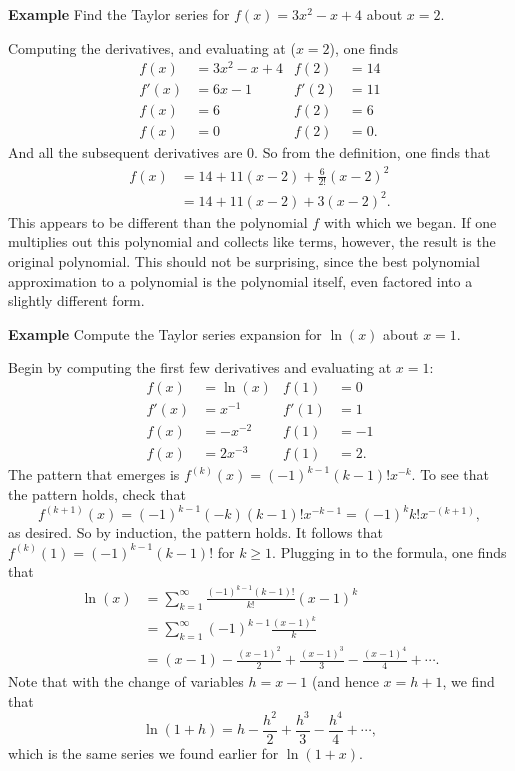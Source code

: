 \documentclass[twoside,openright,titlepage,a4paper]{book}
\begin{document}
\begin{sloppypar}
\textbf{Example} Find the Taylor series for $f(x) = 3x^2-x+4$ about $x=2$.
\begin{examplebox}
Computing the derivatives, and evaluating at ($x=2$), one finds
\begin{align*}
f(x) &= 3x^2-x+4 & f(2) &= 14 \\
f'(x) &= 6x-1 & f'(2) &= 11 \\
f(x) &= 6 & f(2) &= 6 \\
f(x) &= 0 & f(2) &= 0. 
\end{align*}
And all the subsequent derivatives are 0. So from the definition, one finds that
\begin{align*}
f(x) &= 14 + 11(x-2) + \frac{6}{2!}(x-2)^2 \\
&= 14 + 11(x-2) + 3(x-2)^2.
\end{align*}
This appears to be different than the polynomial $f$ with which we began. If one multiplies out this polynomial and collects like terms, however, the result is the original polynomial. This should not be surprising, since the best polynomial approximation to a polynomial is the polynomial itself, even factored into a slightly different form.
\end{examplebox}

\textbf{Example} Compute the Taylor series expansion for $\ln(x)$ about $x=1$. 
\begin{examplebox}
Begin by computing the first few derivatives and evaluating at $x=1$:
\begin{align*}
f(x) &= \ln(x) & f(1) &= 0 \\
f'(x) &= x^{-1} & f'(1) &=1 \\
f(x) &= -x^{-2} & f(1) &= -1 \\
f(x) &= 2x^{-3} & f(1) &= 2.
\end{align*}
The pattern that emerges is $f^{\left(k\right)}(x) = (-1)^{k-1}(k-1)!x^{-k}$. To see that the pattern holds, check that
\begin{equation*}
f^{\left(k+1\right)}(x) = (-1)^{k-1} (-k)(k-1)!x^{-k-1} = (-1)^k k! x^{-(k+1)},
\end{equation*}
as desired. So by induction, the pattern holds. It follows that $f^{\left(k\right)}(1) = (-1)^{k-1}(k-1)!$ for $k \geq 1$. Plugging in to the formula, one finds that
\begin{align*} 
\ln(x) &= \sum_{k=1}^\infty \frac{(-1)^{k-1}(k-1)!}{k!}(x-1)^k \\
&= \sum_{k=1}^\infty (-1)^{k-1} \frac{(x-1)^k}{k} \\
&= (x-1) - \frac{(x-1)^2}{2} + \frac{(x-1)^3}{3} - \frac{(x-1)^4}{4}+\dotsb.
\end{align*}
Note that with the change of variables $h = x-1$ (and hence $x = h+1$, we find that \[ \ln(1+h) = h - \frac{h^2}{2} + \frac{h^3}{3} - \frac{h^4}{4} + \dotsb, \] which is the same series we found earlier for  $\ln(1+x)$.
\end{examplebox}


\end{sloppypar}
\end{document}
